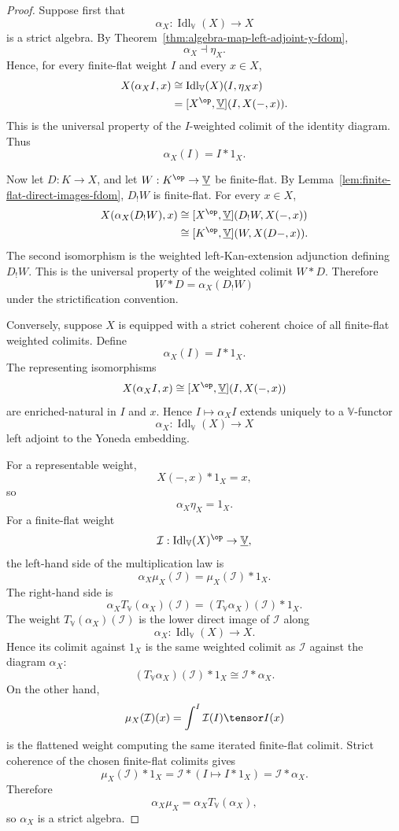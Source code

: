 \begin{proof}
Suppose first that
\[
    \alpha_X:\operatorname{Idl}_{\mathbb V}(X)\to X
\]
is a strict algebra.  By
Theorem~\ref{thm:algebra-map-left-adjoint-y-fdom},
\[
    \alpha_X\dashv\eta_X.
\]
Hence, for every finite-flat weight \(I\) and every \(x\in X\),
\[
\begin{aligned}
    X(\alpha_XI,x)
    &\cong
    \operatorname{Idl}_{\mathbb V}(X)(I,\eta_Xx)
    \\
    &=
    [X^{\op},\underline{\mathbb V}](I,X(-,x)).
\end{aligned}
\]
This is the universal property of the \(I\)-weighted colimit of the identity
diagram.  Thus
\[
    \alpha_X(I)=I*1_X.
\]

Now let \(D:K\to X\), and let \(W:K^{\op}\to\underline{\mathbb V}\) be
finite-flat.  By Lemma~\ref{lem:finite-flat-direct-images-fdom}, \(D_!W\) is
finite-flat.  For every \(x\in X\),
\[
\begin{aligned}
    X(\alpha_X(D_!W),x)
    &\cong
    [X^{\op},\underline{\mathbb V}](D_!W,X(-,x))
    \\
    &\cong
    [K^{\op},\underline{\mathbb V}](W,X(D-,x)).
\end{aligned}
\]
The second isomorphism is the weighted left-Kan-extension adjunction defining
\(D_!W\).  This is the universal property of the weighted colimit \(W*D\).
Therefore
\[
    W*D=\alpha_X(D_!W)
\]
under the strictification convention.

Conversely, suppose \(X\) is equipped with a strict coherent choice of all
finite-flat weighted colimits.  Define
\[
    \alpha_X(I)=I*1_X.
\]
The representing isomorphisms
\[
    X(\alpha_XI,x)
    \cong
    [X^{\op},\underline{\mathbb V}](I,X(-,x))
\]
are enriched-natural in \(I\) and \(x\).  Hence \(I\mapsto \alpha_XI\) extends
uniquely to a \(\mathbb V\)-functor
\[
    \alpha_X:\operatorname{Idl}_{\mathbb V}(X)\to X
\]
left adjoint to the Yoneda embedding.

For a representable weight,
\[
    X(-,x)*1_X=x,
\]
so
\[
    \alpha_X\eta_X=1_X.
\]
For a finite-flat weight
\[
    \mathcal I:
    \operatorname{Idl}_{\mathbb V}(X)^{\op}\to\underline{\mathbb V},
\]
the left-hand side of the multiplication law is
\[
    \alpha_X\mu_X(\mathcal I)=\mu_X(\mathcal I)*1_X.
\]
The right-hand side is
\[
    \alpha_XT_{\mathbb V}(\alpha_X)(\mathcal I)
    =
    (T_{\mathbb V}\alpha_X)(\mathcal I)*1_X.
\]
The weight \(T_{\mathbb V}(\alpha_X)(\mathcal I)\) is the lower direct image of
\(\mathcal I\) along
\[
    \alpha_X:\operatorname{Idl}_{\mathbb V}(X)\to X.
\]
Hence its colimit against \(1_X\) is the same weighted colimit as
\(\mathcal I\) against the diagram \(\alpha_X\):
\[
    (T_{\mathbb V}\alpha_X)(\mathcal I)*1_X
    \cong
    \mathcal I*\alpha_X.
\]
On the other hand,
\[
    \mu_X(\mathcal I)(x)
    =
    \int^{I}\mathcal I(I)\tensor I(x)
\]
is the flattened weight computing the same iterated finite-flat colimit.
Strict coherence of the chosen finite-flat colimits gives
\[
    \mu_X(\mathcal I)*1_X
    =
    \mathcal I*(I\mapsto I*1_X)
    =
    \mathcal I*\alpha_X.
\]
Therefore
\[
    \alpha_X\mu_X=\alpha_XT_{\mathbb V}(\alpha_X),
\]
so \(\alpha_X\) is a strict algebra.


\end{proof}
